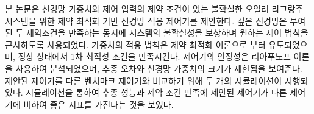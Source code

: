 
본 논문은 신경망 가중치와 제어 입력의 제약 조건이 있는 불확실한 오일러-라그랑주 시스템을 위한 제약 최적화 기반 신경망 적응 제어기를 제안한다.
깊은 신경망은 부여된 두 제약조건을 만족하는 동시에 시스템의 불확실성을 보상하며 원하는 제어 법칙을 근사하도록 사용되었다.
가중치의 적응 법칙은 제약 최적화 이론으로 부터 유도되었으며, 정상 상태에서 1차 최적성 조건을 만족시킨다.
제어기의 안정성은 리아푸노프 이론을 사용하여 분석되었으며, 추종 오차와 신경망 가중치의 크기가 제한됨을 보여준다.
제안된 제어기를 다른 벤치마크 제어기와 비교하기 위해 두 개의 시뮬레이션이 시행되었다.
시뮬레이션을 통하여 추종 성능과 제약 조건 만족에 제안된 제어기가 다른 제어기에 비하여 좋은 지표를 가진다는 것을 보였다.